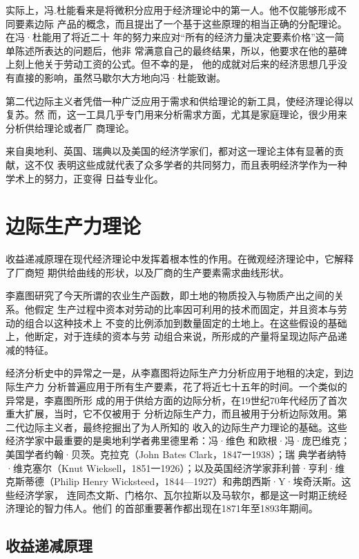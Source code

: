 实际上，冯.杜能看来是将微积分应用于经济理论中的第一人。他不仅能够形成不同要素边际
产品的概念，而且提出了一个基于这些原理的相当正确的分配理论。在冯·杜能用了将近二十
年的努力来应对“所有的经济力量决定要素价格”这一简单陈述所表达的问题后，他非
常满意自己的最终结果，所以，他要求在他的墓碑上刻上他关于劳动工资的公式。但不幸的是，
他的成就对后来的经济思想几乎没有直接的影响，虽然马歇尔大方地向冯·杜能致谢。

第二代边际主义者凭借一种广泛应用于需求和供给理论的新工具，使经济理论得以复苏。然
而，这一工具几乎专门用来分析需求方面，尤其是家庭理论，很少用来分析供给理论或者厂
商理论。

来自奥地利、英国、瑞典以及美国的经济学家们，都对这一理论主体有显著的贡献，这不仅
表明这些成就代表了众多学者的共同努力，而且表明经济学作为一种学术上的努力，正变得
日益专业化。

\section{边际生产力理论}

收益递减原理在现代经济理论中发挥着根本性的作用。在微观经济理论中，它解释了厂商短
期供给曲线的形状，以及厂商的生产要素需求曲线形状。

李嘉图研究了今天所谓的农业生产函数，即土地的物质投入与物质产出之间的关系。他假定
生产过程中资本对劳动的比率因可利用的技术而固定，并且资本与劳动的组合以这种技术上
不变的比例添加到数量固定的土地上。在这些假设的基础上，他断定，对于连续的资本与劳
动组合来说，所形成的产量将呈现边际产品递减的特征。

经济分析史中的异常之一是，从李嘉图将边际生产力分析应用于地租的决定，到边际生产力
分析普遍应用于所有生产要素，花了将近七十五年的时间。一个类似的异常是，李嘉图所形
成的用于供给方面的边际分析，在19世纪70年代经历了首次重大扩展，当时，它不仅被用于
分析边际生产力，而且被用于分析边际效用。第二代边际主义者，最终挖掘出了为人所知的
收入的边际生产力理论的基础。这些经济学家中最重要的是奥地利学者弗里德里希：冯·维色
和欧根·冯·庞巴维克；美国学者约翰·贝茨。克拉克（John Bates Clark，1847一1938）；瑞
典学者纳特·维克塞尔（Knut Wieksell，1851一1926）；以及英国经济学家菲利普·亨利·维
克斯蒂德（Philip Henry Wicksteed，1844—1927）和弗朗西斯·Y·埃奇沃斯。这些经济学家，
连同杰文斯、门格尔、瓦尔拉斯以及马软尔，都是这一时期正统经济理论的智力伟人。他们
的首部重要著作都出现在1871年至1893年期间。

\subsection{收益递减原理}

